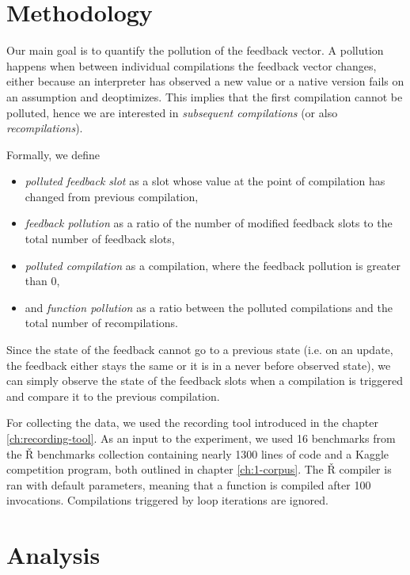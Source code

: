 \section{Methodology}

Our main goal is to quantify the pollution of the feedback vector. A pollution happens when between individual compilations the feedback vector changes, either because an interpreter has observed a new value or a native version fails on an assumption and deoptimizes. This implies that the first compilation cannot be polluted, hence we are interested in \textit{subsequent compilations} (or also \textit{recompilations}).

Formally, we define
\begin{itemize}
	\item{} \textit{polluted feedback slot} as a slot whose value at the point of compilation has changed from previous compilation,
	\item{} \textit{feedback pollution} as a ratio of the number of modified feedback slots to the total number of feedback slots,
	\item{} \textit{polluted compilation} as a compilation, where the feedback pollution is greater than 0,
	\item{} and \textit{function pollution} as a ratio between the polluted compilations and the total number of recompilations.
\end{itemize}

Since the state of the feedback cannot go to a previous state (i.e. on an update, the feedback either stays the same or it is in a never before observed state), we can simply observe the state of the feedback slots when a compilation is triggered and compare it to the previous compilation.

For collecting the data, we used the recording tool introduced in the chapter \ref{ch:recording-tool}. As an input to the experiment, we used 16 benchmarks from the Ř benchmarks collection containing nearly 1300 lines of code and a Kaggle competition program, both outlined in chapter \ref{ch:1-corpus}. The Ř compiler is ran with default parameters, meaning that a function is compiled after 100 invocations. Compilations triggered by loop iterations are ignored.

\section{Analysis}

